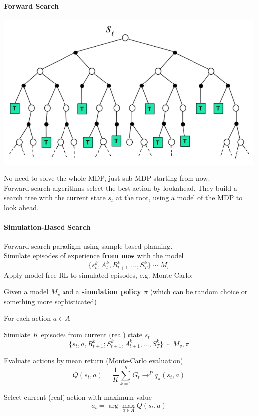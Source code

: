\documentclass[10pt]{report}
\begin{document}
\paragraph{Forward Search}
\begin{center}
	\includegraphics[scale=0.5]{186.png}
\end{center}
No need to solve the whole MDP, just sub-MDP starting from now.\\
Forward search algorithms select the best action by lookahead. They build a search tree with the current state $s_t$ at the root, using a model of the MDP to look ahead.
\paragraph{Simulation-Based Search} Forward search paradigm using sample-based planning.\\
Simulate episodes of experience \textbf{from now} with the model 
$$\{s_t^k,A_t^k,R_{t+1}^k;\ldots,S_T^k\}\sim M_v$$
Apply model-free RL to simulated episodes, e.g. Monte-Carlo:
\begin{list}{}{}
	\item Given a model $M_v$ and a \textbf{simulation policy $\pi$} (which can be random choice or something more sophisticated)
	\item For each action $a\in A$\begin{list}{}{}
		\item Simulate $K$ episodes from current (real) state $s_t$
		$$\{s_t,a,R_{t+1}^k;S_{t+1}^k,A_{t+1}^k,\ldots,S_T^k\}\sim M_v,\pi$$
		\item Evaluate actions by mean return (Monte-Carlo evaluation)
		$$Q(s_t,a)=\frac{1}{K}\sum_{k=1}^K G_t\rightarrow^P q_\pi(s_t,a)$$
	\end{list}
	\item Select current (real) action with maximum value
	$$a_t=\arg\max_{a\in A} Q(s_t,a)$$
\end{list}
\end{document}
